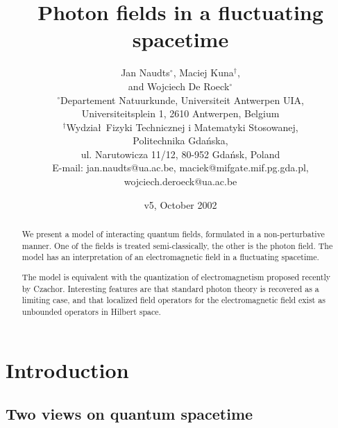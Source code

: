 \documentclass[12pt,a4paper]{article}
\begin{document}
\title{Photon fields in a fluctuating spacetime}

\author{  Jan Naudts$^\circ$, Maciej Kuna$^\dagger$,\\
          and Wojciech De Roeck$^\circ$\\
          \small
          $^\circ$Departement Natuurkunde, Universiteit Antwerpen UIA,\\
          \small
          Universiteitsplein 1, 2610 Antwerpen, Belgium\\
          \small
          $^\dagger$Wydzia\l\ Fizyki Technicznej i Matematyki Stosowanej,\\
	  \small
	  Politechnika Gda\'{n}ska,\\
	  \small
	  ul. Narutowicza 11/12, 80-952 Gda\'{n}sk, Poland\\
	  \small
	  E-mail: jan.naudts@ua.ac.be,
	  maciek@mifgate.mif.pg.gda.pl,\\
	  \small
	  wojciech.deroeck@ua.ac.be
}
\date{v5, October 2002}
\maketitle

\begin{abstract}

We present a model of interacting quantum fields, formulated in
a non-perturbative manner. One of the fields is treated
semi-classically, the other is the photon field. The
model has an interpretation of an electromagnetic field
in a fluctuating spacetime.

The model is equivalent with the quantization of 
electromagnetism proposed recently by Czachor.
Interesting features are that standard photon theory is recovered
as a limiting case, and that localized field operators
for the electromagnetic field exist as unbounded
operators in Hilbert space.

\end{abstract}

\section{Introduction}


\subsection{Two views on quantum spacetime}
\end{document}
